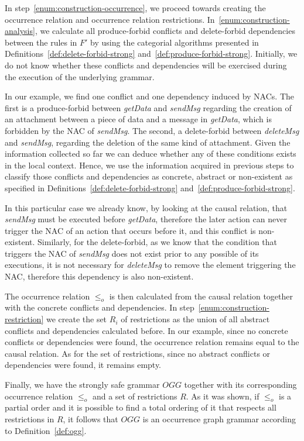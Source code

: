 In step~\ref{enum:construction-occurrence}, we proceed towards creating the occurrence relation and occurrence relation restrictions. 
  In~\ref{enum:construction-analysis}, we calculate all produce-forbid conflicts and delete-forbid dependencies between the rules in $F'$ by using the categorial algorithms presented in Definitions~\ref{def:delete-forbid-strong} and~\ref{def:produce-forbid-strong}. 
  Initially, we do not know whether these conflicts and dependencies will be exercised during the execution of the underlying grammar. 

  In our example, we find one conflict and one dependency induced by NACs. The first is a produce-forbid between \emph{getData} and \emph{sendMsg} regarding the creation of an attachment between a piece of data and a message in \emph{getData}, which is forbidden by the NAC of \emph{sendMsg}.
  The second, a delete-forbid between \emph{deleteMsg} and \emph{sendMsg}, regarding the deletion of the same kind of attachment.
  Given the information collected so far we can deduce whether any of these
conditions exists in the local context.
  Hence, we use the information acquired in previous steps to classify those conflicts and dependencies as concrete, abstract or non-existent as specified in
Definitions~\ref{def:delete-forbid-strong} and~\ref{def:produce-forbid-strong}. 

In this particular case we already know, by looking at the causal relation, that \emph{sendMsg} must be executed before \emph{getData}, therefore the later action can never trigger the NAC of an action that occurs before it, and this conflict is non-existent. Similarly, for the delete-forbid, as we know that the condition that triggers the NAC of \emph{sendMsg} does not exist prior to any possible of its executions, it is not necessary for \emph{deleteMsg} to remove the element triggering the NAC, therefore this dependency is also non-existent.

The occurrence relation $\leq_o$ is then calculated from the causal relation together with the concrete conflicts and dependencies. In step~\ref{enum:construction-restriction} we create the set $R_i$ of restrictions as the union of all abstract conflicts and dependencies calculated before. In our example, since no concrete conflicts or dependencies were found, the occurrence relation remains equal to the causal relation. As for the set of restrictions, since no abstract conflicts or dependencies
were found, it remains empty.

Finally, we have the strongly safe grammar $OGG$ together with its corresponding occurrence relation $\leq_o$ and a set of restrictions $R$. As it was shown, if $\leq_o$ is a partial order and it is possible to find a total ordering of it that respects all restrictions in $R$, it follows that $OGG$ is an occurrence graph grammar according to Definition~\ref{def:ogg}.

